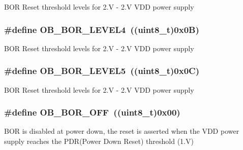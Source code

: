 B\-O\-R Reset threshold levels for 2.\-V -\/ 2.\-V V\-D\-D power supply \hypertarget{group___f_l_a_s_h_ex___option___bytes___b_o_r___level_gaabff673365a8fc0c7e5b4d62f8b6f16c}{
\subsubsection[{O\-B\-\_\-\-B\-O\-R\-\_\-\-L\-E\-V\-E\-L4}]{\setlength{\rightskip}{0pt plus 5cm}\#define O\-B\-\_\-\-B\-O\-R\-\_\-\-L\-E\-V\-E\-L4~((uint8\-\_\-t)0x0\-B)}}\label{group___f_l_a_s_h_ex___option___bytes___b_o_r___level_gaabff673365a8fc0c7e5b4d62f8b6f16c}
B\-O\-R Reset threshold levels for 2.\-V -\/ 2.\-V V\-D\-D power supply \hypertarget{group___f_l_a_s_h_ex___option___bytes___b_o_r___level_ga20a498ddcc36d0fe244f280227364c07}{
\subsubsection[{O\-B\-\_\-\-B\-O\-R\-\_\-\-L\-E\-V\-E\-L5}]{\setlength{\rightskip}{0pt plus 5cm}\#define O\-B\-\_\-\-B\-O\-R\-\_\-\-L\-E\-V\-E\-L5~((uint8\-\_\-t)0x0\-C)}}\label{group___f_l_a_s_h_ex___option___bytes___b_o_r___level_ga20a498ddcc36d0fe244f280227364c07}
B\-O\-R Reset threshold levels for 2.\-V -\/ 2.\-V V\-D\-D power supply \hypertarget{group___f_l_a_s_h_ex___option___bytes___b_o_r___level_gaabc231cb1d05a94fe860f67bb5a37b12}{
\subsubsection[{O\-B\-\_\-\-B\-O\-R\-\_\-\-O\-F\-F}]{\setlength{\rightskip}{0pt plus 5cm}\#define O\-B\-\_\-\-B\-O\-R\-\_\-\-O\-F\-F~((uint8\-\_\-t)0x00)}}\label{group___f_l_a_s_h_ex___option___bytes___b_o_r___level_gaabc231cb1d05a94fe860f67bb5a37b12}
B\-O\-R is disabled at power down, the reset is asserted when the V\-D\-D power supply reaches the P\-D\-R(\-Power Down Reset) threshold (1.\-V) 